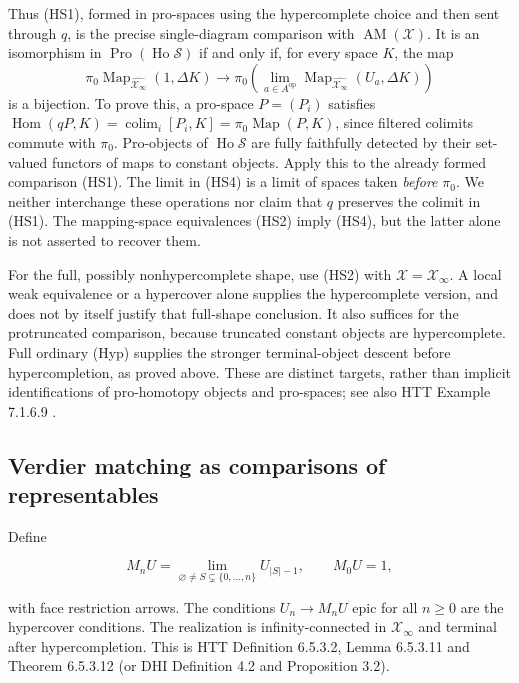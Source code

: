 \documentclass[11pt,a4paper]{article}
\theoremstyle{definition}
\begin{document}
Thus (HS1), formed in pro-spaces using the hypercomplete choice and
then sent through \(q\), is the precise single-diagram comparison with
\(\operatorname{AM}(\mathcal X)\). It is an isomorphism in
\(\operatorname{Pro}(\operatorname{Ho}\mathcal S)\) if and only if, for
every space \(K\), the map
\[
\pi_0\operatorname{Map}_{\widehat{\mathcal X_\infty}}(1,\Delta K)
\longrightarrow
\pi_0\!\left(\lim_{a\in A^{\mathrm{op}}}
\operatorname{Map}_{\widehat{\mathcal X_\infty}}(U_a,\Delta K)\right)
\tag{HS4}
\]
is a bijection. To prove this, a pro-space \(P=(P_i)\) satisfies
\(\operatorname{Hom}(qP,K)=\operatorname{colim}_i[P_i,K]
=\pi_0\operatorname{Map}(P,K)\), since filtered colimits commute with
\(\pi_0\). Pro-objects of \(\operatorname{Ho}\mathcal S\) are fully
faithfully detected by their set-valued functors of maps to constant
objects. Apply this to the already formed comparison (HS1).
The limit in (HS4) is a limit of spaces taken \emph{before} \(\pi_0\).
We neither interchange these operations nor claim that \(q\) preserves
the colimit in (HS1). The mapping-space equivalences (HS2) imply
(HS4), but the latter alone is not asserted to recover them.

For the full, possibly nonhypercomplete shape, use (HS2) with
\(\mathscr X=\mathcal X_\infty\). A local weak equivalence or a
hypercover alone supplies the hypercomplete version, and does not by
itself justify that full-shape conclusion. It also suffices for the
protruncated comparison, because truncated constant objects are
hypercomplete. Full ordinary (Hyp) supplies the stronger terminal-object
descent before hypercompletion, as proved above. These are distinct
targets, rather than implicit identifications of pro-homotopy objects
and pro-spaces; see also HTT Example 7.1.6.9 \cite{HTT}.

\subsection{Verdier matching as comparisons of
representables}\label{b5.7.-verdier-matching-as-comparisons-of-representables}

Define

\[M_nU=\lim_{\varnothing\ne S\subsetneq\{0,\ldots,n\}}U_{|S|-1},\qquad M_0U=1,\]

with face restriction arrows. The conditions \(U_n\to M_nU\) epic for
all \(n\ge0\) are the hypercover conditions. The realization is
infinity-connected in \(\mathcal X_\infty\) and terminal after
hypercompletion. This is HTT Definition 6.5.3.2, Lemma 6.5.3.11 and
Theorem 6.5.3.12 \cite{HTT} (or DHI Definition 4.2 and Proposition
3.2).
\end{document}
